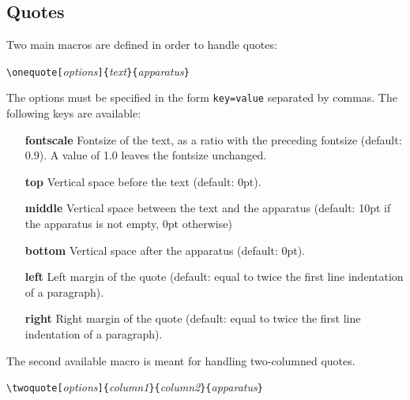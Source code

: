 \documentclass[11pt,a4paper]{article}
\begin{document}
	\subsection{Quotes}
	
	Two main macros are defined in order to handle quotes:
	
	\medskip
	
	\verb|\onequote[|\emph{options}\verb|]{|\emph{text}\verb|}{|\emph{apparatus}\verb|}|
	
	\medskip
	
	The options must be specified in the form \verb|key=value| separated by commas. The following keys are available:
	\begin{itemize}
		\item[\textbf{fontscale}] Fontsize of the text, as a ratio with the preceding fontsize (default: 0.9). A value of 1.0 leaves the fontsize  unchanged.
		\item[\textbf{top}] Vertical space before the text (default: 0pt).
		\item[\textbf{middle}] Vertical space between the text and the apparatus (default: 10pt if the apparatus is not empty, 0pt otherwise)
		\item[\textbf{bottom}] Vertical space after the apparatus (default: 0pt).
		\item[\textbf{left}] Left margin of the quote (default: equal to twice the first line indentation of a paragraph).
		\item[\textbf{right}] Right margin of the quote (default: equal to twice the first line indentation of a paragraph).
	\end{itemize}
	
	The second available macro is meant for handling two-columned quotes.
	
	\medskip
	
	\verb|\twoquote[|\emph{options}\verb|]{|\emph{column1}\verb|}{|\emph{column2}\verb|}{|\emph{apparatus}\verb|}| 
	
	\medskip
	
\end{document}
